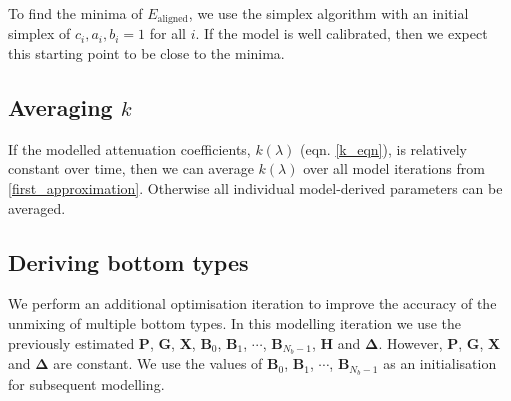 \documentclass[12pt]{article}
\numberwithin{equation}{section}
\begin{document}
To find the minima of $E_{\text{aligned}}$, we use the simplex algorithm \cite{oneil1971} with an 
initial simplex of $c_i,a_i,b_i = 1$ for all $i$. If the model is well calibrated, 
then we expect this starting point to be close to the minima. \\


	\subsection{Averaging $k$}

If the modelled attenuation coefficients, $k(\lambda)$ (eqn. \ref{k_eqn}), is relatively 
constant over time, then we can average $k(\lambda)$ over all model iterations from 
\ref{first_approximation}. Otherwise all individual model-derived parameters can be 
averaged. 

	\subsection{Deriving bottom types}

We perform an additional optimisation iteration to improve the accuracy of the unmixing of 
multiple bottom types. In this modelling iteration we use the previously estimated  
\textbf{P}, \textbf{G}, \textbf{X}, $\textbf{B}_0$, $\textbf{B}_1$, $\cdots$, $\textbf{B}_{N_b-1}$, 
\textbf{H} and $\mathbf{\Delta}$. However, \textbf{P}, \textbf{G}, \textbf{X} and 
$\mathbf{\Delta}$ are constant. We use the values of $\textbf{B}_0$, $\textbf{B}_1$, 
$\cdots$, $\textbf{B}_{N_b-1}$ as an initialisation for subsequent modelling. \\
\end{document}
